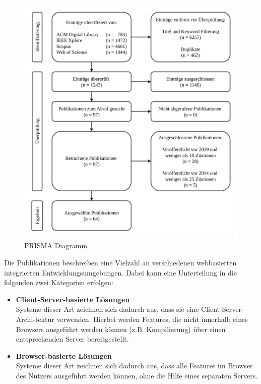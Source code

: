 \begin{figure}[htbp]
    \centering
    \includegraphics[width=\textwidth]{diagrams/PRISMA.pdf}
    \caption{PRISMA Diagramm}
    \label{prisma-diagram}
\end{figure}

Die Publikationen beschreiben eine Vielzahl an verschiedenen webbasierten integrierten Entwicklungsumgebungen. Dabei kann eine Unterteilung in die folgenden zwei Kategorien erfolgen:

\begin{itemize}
    \item \textbf{Client-Server-basierte Lösungen} \\
          Systeme dieser Art zeichnen sich dadurch aus, dass sie eine Client-Server-Archi-tektur verwenden. Hierbei werden Features, die nicht innerhalb eines Browsers ausgeführt werden können (z.B. Kompilierung) über einen entsprechenden Server bereitgestellt.
    \item \textbf{Browser-basierte Lösungen} \\
          Systeme dieser Art zeichnen sich dadurch aus, dass alle Features im Browser des Nutzers ausgeführt werden können, ohne die Hilfe eines separaten Servers.
\end{itemize}

